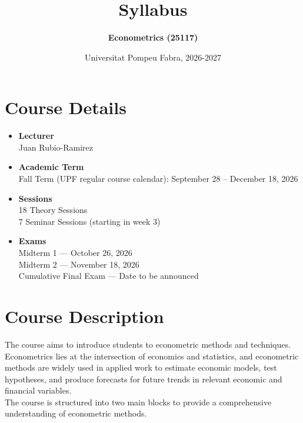\documentclass[12pt]{article}
\title{\textbf{Syllabus}}
\author{\textbf{Econometrics (25117)}}
\date{Universitat Pompeu Fabra, 2026-2027}
\begin{document}
\maketitle

\section*{Course Details}
\begin{itemize}
    \item \textbf{Lecturer}\\
    Juan Rubio-Ramirez
    \item \textbf{Academic Term}\\
    Fall Term (UPF regular course calendar): September 28 -- December 18, 2026
    \item \textbf{Sessions}\\
    18 Theory Sessions\\
    7 Seminar Sessions (starting in week 3)
    \item \textbf{Exams}\\
    Midterm 1 --- October 26, 2026\\
    Midterm 2 --- November 18, 2026\\
    Cumulative Final Exam --- Date to be announced
\end{itemize}
\section*{Course Description}
The course aims to introduce students to econometric methods and techniques. Econometrics lies at the intersection of economics and statistics, and econometric methods are widely used in applied work to estimate economic models, test hypotheses, and produce forecasts for future trends in relevant economic and financial variables.\\

The course is structured into two main blocks to provide a comprehensive understanding of econometric methods.
\end{document}
